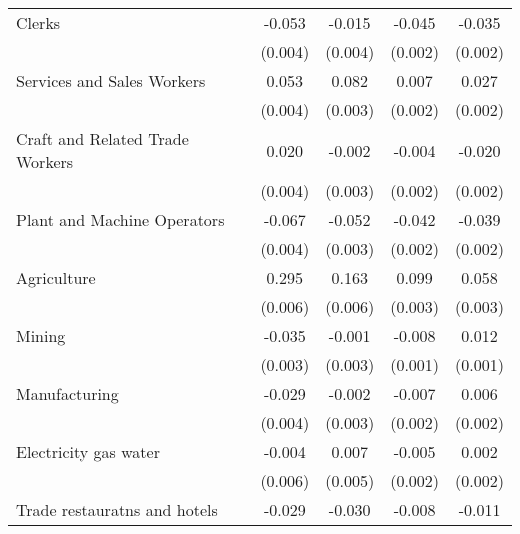 \begin{table}[htbp]
\begin{tabular}{l*{4}{c}}
Clerks              &      -0.053\sym{***}&      -0.015\sym{***}&      -0.045\sym{***}&      -0.035\sym{***}\\
                    &     (0.004)         &     (0.004)         &     (0.002)         &     (0.002)         \\
Services and Sales Workers&       0.053\sym{***}&       0.082\sym{***}&       0.007\sym{***}&       0.027\sym{***}\\
                    &     (0.004)         &     (0.003)         &     (0.002)         &     (0.002)         \\
Craft and Related Trade Workers&       0.020\sym{***}&      -0.002         &      -0.004\sym{**} &      -0.020\sym{***}\\
                    &     (0.004)         &     (0.003)         &     (0.002)         &     (0.002)         \\
Plant and Machine Operators&      -0.067\sym{***}&      -0.052\sym{***}&      -0.042\sym{***}&      -0.039\sym{***}\\
                    &     (0.004)         &     (0.003)         &     (0.002)         &     (0.002)         \\
Agriculture         &       0.295\sym{***}&       0.163\sym{***}&       0.099\sym{***}&       0.058\sym{***}\\
                    &     (0.006)         &     (0.006)         &     (0.003)         &     (0.003)         \\
Mining              &      -0.035\sym{***}&      -0.001         &      -0.008\sym{***}&       0.012\sym{***}\\
                    &     (0.003)         &     (0.003)         &     (0.001)         &     (0.001)         \\
Manufacturing       &      -0.029\sym{***}&      -0.002         &      -0.007\sym{***}&       0.006\sym{***}\\
                    &     (0.004)         &     (0.003)         &     (0.002)         &     (0.002)         \\
Electricity gas water&      -0.004         &       0.007         &      -0.005         &       0.002         \\
                    &     (0.006)         &     (0.005)         &     (0.002)         &     (0.002)         \\
Trade restauratns and hotels&      -0.029\sym{***}&      -0.030\sym{***}&      -0.008\sym{***}&      -0.011\sym{***}\\

\end{tabular}
\end{table}
